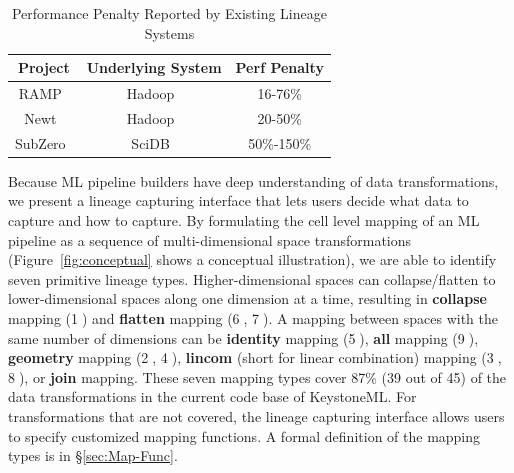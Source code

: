 \documentclass{sig-alternate}
\begin{document}
\begin{table}[t]
\begin{center}
    \caption{Performance Penalty Reported by Existing Lineage Systems}
    \begin{scriptsize}
    \begin{tabular}{ | c | c | c |}
    \hline
    Project & Underlying System & Perf Penalty  \\ \hline \hline
    RAMP~\cite{ikeda11} & Hadoop~\cite{HADOOP} & 16-76\% \\ \hline
    Newt~\cite{logothetis13} & Hadoop~\cite{HADOOP} & 20-50\% \\ \hline
    SubZero~\cite{wu13} & SciDB~\cite{brown10} & 50\%-150\% \\ \hline
    \end{tabular}
    \end{scriptsize}
    \label{tb:overhead}
\end{center}   
\end{table}

Because ML pipeline builders have deep understanding of data transformations,  
we present a lineage capturing interface that lets users decide what data to capture and how to capture.  
By formulating the cell level mapping of an ML pipeline as a sequence of multi-dimensional space transformations
(Figure~\ref{fig:conceptual} shows a conceptual illustration), we are able to identify seven primitive lineage types.
Higher-dimensional spaces can collapse/flatten to lower-dimensional spaces along one dimension at a time, 
resulting in {\bf collapse} mapping (\textcircled{1}) and {\bf flatten} mapping (\textcircled{6}, \textcircled{7}). 
A mapping between spaces with the same number of dimensions can be {\bf identity} mapping (\textcircled{5}), {\bf all} mapping (\textcircled{9}), 
{\bf geometry} mapping (\textcircled{2}, \textcircled{4}), {\bf lincom} (short for linear combination) mapping (\textcircled{3}, \textcircled{8}),
or {\bf join} mapping. 
These seven mapping types cover 87\% (39 out of 45) of the data transformations in the current code base of KeystoneML. 
For transformations that are not covered, the lineage capturing interface allows users to specify customized mapping functions.
A formal definition of the mapping types is in \S\ref{sec:Map-Func}.
\end{document}
